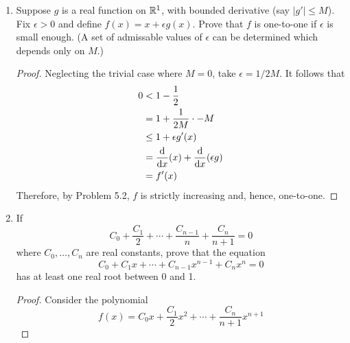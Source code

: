 \documentclass[../psets.tex]{subfiles}
\begin{document}
\begin{enumerate}[label={\textbf{\arabic*.}}]
\begin{proof}
        \begingroup
        \allowdisplaybreaks
        \begin{align*}
            \frac{1}{f'(x)} &= \frac{1}{\lim_{y\to x}\frac{f(y)-f(x)}{y-x}}\\
            &= \lim_{y\to x}\frac{1}{\frac{f(y)-f(x)}{y-x}}\\
            &= \lim_{y\to x}\frac{y-x}{f(y)-f(x)}\\
            &= \lim_{y\to x}\frac{g(f(y))-g(f(x))}{f(y)-f(x)}\\
            &= g'(f(x))
        \end{align*}
        \endgroup
        as desired.
    \end{proof}
    \item Suppose $g$ is a real function on $\mathbb{R}^1$, with bounded derivative (say $|g'|\leq M$). Fix $\epsilon>0$ and define $f(x)=x+\epsilon g(x)$. Prove that $f$ is one-to-one if $\epsilon$ is small enough. (A set of admissable values of $\epsilon$ can be determined which depends only on $M$.)
    \begin{proof}
        Neglecting the trivial case where $M=0$, take $\epsilon=1/2M$. It follows that
        \begin{align*}
            0 &< 1-\frac{1}{2}\\
            &= 1+\frac{1}{2M}\cdot -M\\
            &\leq 1+\epsilon g'(x)\\
            &= \dv{x}(x)+\dv{x}(\epsilon g)\\
            &= f'(x)
        \end{align*}
        Therefore, by Problem 5.2, $f$ is strictly increasing and, hence, one-to-one.
    \end{proof}
    \item If
    \begin{equation*}
        C_0+\frac{C_1}{2}+\cdots+\frac{C_{n-1}}{n}+\frac{C_n}{n+1} = 0
    \end{equation*}
    where $C_0,\dots,C_n$ are real constants, prove that the equation
    \begin{equation*}
        C_0+C_1x+\cdots+C_{n-1}x^{n-1}+C_nx^n = 0
    \end{equation*}
    has at least one real root between 0 and 1.
    \begin{proof}
        Consider the polynomial
        \begin{equation*}
            f(x) = C_0x+\frac{C_1}{2}x^2+\cdots+\frac{C_n}{n+1}x^{n+1}
        \end{equation*}

\end{proof}
\end{enumerate}
\end{document}
